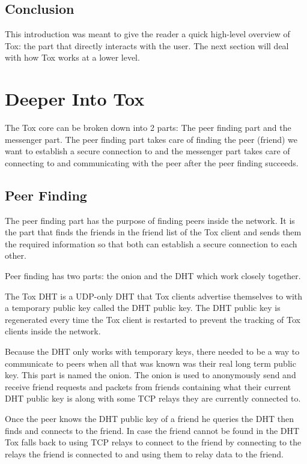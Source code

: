 \documentclass{tox}
\begin{document}
\subsection{Conclusion}

This introduction was meant to give the reader a quick high-level overview of 
Tox: the part that directly interacts with the user. The next section will deal 
with how Tox works at a lower level.

\section{Deeper Into Tox}

The Tox core can be broken down into 2 parts: The peer finding part and the 
messenger part. The peer finding part takes care of finding the peer (friend) 
we 
want to establish a secure connection to and the messenger part takes care of 
connecting to and communicating with the peer after the peer finding succeeds.

\subsection{Peer Finding}

The peer finding part has the purpose of finding peers inside the network. It 
is the part that finds the friends in the friend list of the Tox client and 
sends them the required information so that both can establish a secure 
connection to each other.

Peer finding has two parts: the onion and the DHT which work closely together.

The Tox DHT is a UDP-only DHT that Tox clients advertise themselves to with a 
temporary public key called the DHT public key. The DHT public key is 
regenerated every time the Tox client is restarted to prevent the tracking of 
Tox clients inside the network.

Because the DHT only works with temporary keys, there needed to be a way to 
communicate to peers when all that was known was their real long term public 
key. This part is named the onion. The onion is used to anonymously send and 
receive friend requests and packets from friends containing what their current 
DHT public key is along with some TCP relays they are currently connected to.

Once the peer knows the DHT public key of a friend he queries the DHT then 
finds and connects to the friend. In case the friend cannot be found in the DHT 
Tox falls back to using TCP relays to connect to the friend by connecting to 
the relays the friend is connected to and using them to relay data to the 
friend.
\end{document}
